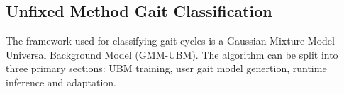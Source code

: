 \documentclass{sig-alternate}
\begin{document}
\subsection{Unfixed Method Gait Classification}
The framework used for classifying gait cycles is a Gaussian Mixture Model-Universal Background Model (GMM-UBM). The algorithm can be split into three primary sections: UBM training, user gait model genertion, runtime inference and adaptation. 
\end{document}
